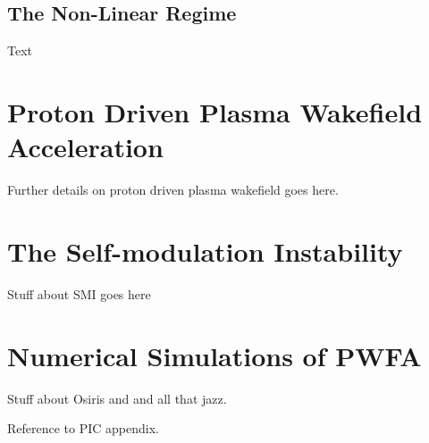 \subsection{The Non-Linear Regime}
\label{Int:PWFA:NLin}

Text

\section{Proton Driven Plasma Wakefield Acceleration}
\label{Int:PDPWFA}

Further details on proton driven plasma wakefield goes here.

\section{The Self-modulation Instability}
\label{Int:SMI}

Stuff about SMI goes here

\section{Numerical Simulations of PWFA}
\label{Int:Sim}

Stuff about Osiris and and all that jazz.

Reference to PIC appendix.

